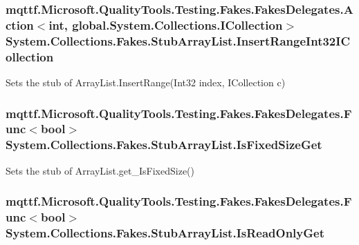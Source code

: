 \hypertarget{class_system_1_1_collections_1_1_fakes_1_1_stub_array_list_aa1ebf69340a4c131331f366d3dc873c6}{
\subsubsection[{Insert\-Range\-Int32\-I\-Collection}]{\setlength{\rightskip}{0pt plus 5cm}mqttf.\-Microsoft.\-Quality\-Tools.\-Testing.\-Fakes.\-Fakes\-Delegates.\-Action$<$int, global.\-System.\-Collections.\-I\-Collection$>$ System.\-Collections.\-Fakes.\-Stub\-Array\-List.\-Insert\-Range\-Int32\-I\-Collection}}\label{class_system_1_1_collections_1_1_fakes_1_1_stub_array_list_aa1ebf69340a4c131331f366d3dc873c6}


Sets the stub of Array\-List.\-Insert\-Range(\-Int32 index, I\-Collection c)

\hypertarget{class_system_1_1_collections_1_1_fakes_1_1_stub_array_list_ac07fcf54b43a0fcdbbc3002905d1e733}{
\subsubsection[{Is\-Fixed\-Size\-Get}]{\setlength{\rightskip}{0pt plus 5cm}mqttf.\-Microsoft.\-Quality\-Tools.\-Testing.\-Fakes.\-Fakes\-Delegates.\-Func$<$bool$>$ System.\-Collections.\-Fakes.\-Stub\-Array\-List.\-Is\-Fixed\-Size\-Get}}\label{class_system_1_1_collections_1_1_fakes_1_1_stub_array_list_ac07fcf54b43a0fcdbbc3002905d1e733}


Sets the stub of Array\-List.\-get\-\_\-\-Is\-Fixed\-Size()

\hypertarget{class_system_1_1_collections_1_1_fakes_1_1_stub_array_list_adc3267675a1c2a46202e8556ab4f2065}{
\subsubsection[{Is\-Read\-Only\-Get}]{\setlength{\rightskip}{0pt plus 5cm}mqttf.\-Microsoft.\-Quality\-Tools.\-Testing.\-Fakes.\-Fakes\-Delegates.\-Func$<$bool$>$ System.\-Collections.\-Fakes.\-Stub\-Array\-List.\-Is\-Read\-Only\-Get}}\label{class_system_1_1_collections_1_1_fakes_1_1_stub_array_list_adc3267675a1c2a46202e8556ab4f2065}


